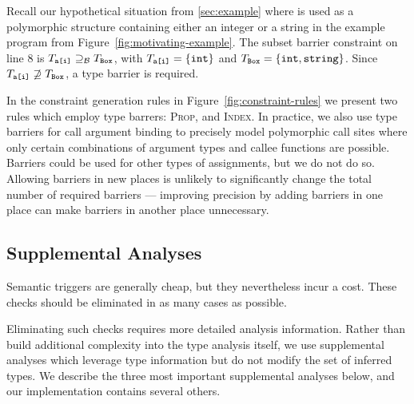 Recall our hypothetical situation from \Section\ref{sec:example} where  is
used as a polymorphic structure containing either an integer or a string in
the example program from Figure~\ref{fig:motivating-example}. The subset
barrier constraint on line 8 is $T_{\texttt{a[i]}} \supseteq_\mathcal{B} T_{\texttt{Box}}$,
with $T_{\texttt{a[i]}} = \{\texttt{int}\}$ and $T_{\texttt{Box}} = \{\texttt{int},
\texttt{string}\}$. Since $T_{\texttt{a[i]}} \not\supseteq T_{\texttt{Box}}$, a type
barrier is required.

In the constraint generation rules in Figure~\ref{fig:constraint-rules} we
present two rules which employ type barrers:
\textsc{Prop}, and \textsc{Index}. In practice, we also use type barriers for
call argument binding to precisely model polymorphic call sites where
only certain combinations of argument types and callee functions are possible.
Barriers could be used for other types of assignments, but we do not do so.
Allowing barriers in new places is unlikely to significantly change the total
number of required barriers --- improving precision by adding barriers in one
place can make barriers in another place unnecessary.

\subsection{Supplemental Analyses}
\label{sec:supplemental-analyses}

Semantic triggers are generally cheap, but they nevertheless incur a cost.
These checks should be eliminated in as many cases as possible.

Eliminating such checks requires more detailed analysis information.
Rather than build additional complexity into the type analysis itself,
we use supplemental analyses which leverage type information but do not
modify the set of inferred types.
We describe the three most important supplemental analyses below, and
our implementation contains several others.

